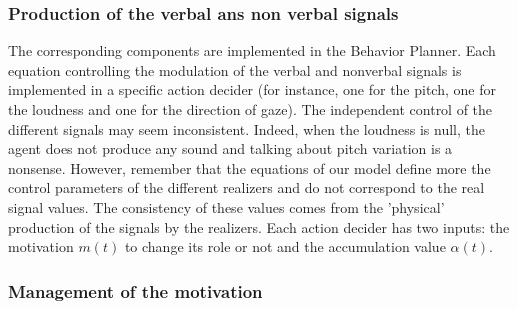
\subsubsection{Production of the verbal ans non verbal signals}

The corresponding components are implemented in the Behavior Planner. Each equation controlling the modulation of the verbal and nonverbal signals is implemented in a specific action decider (for instance, one for the pitch, one for the loudness and one for the direction of gaze). 
The independent control of the different signals may seem inconsistent. Indeed, when the loudness is null, the agent does not produce any sound and talking about pitch variation is a nonsense. However, remember that the equations of our model define more the control parameters of the different realizers and do not correspond to the real signal values. The consistency of these values comes from the 'physical' production of the signals by the realizers.
Each action decider has two inputs: the motivation $m(t)$ to change its role or not and the accumulation value $\alpha(t)$. 

\subsubsection{Management of the motivation}

